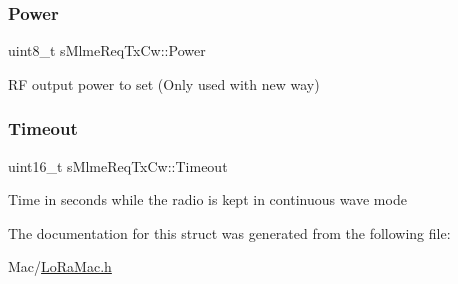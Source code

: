 \subsubsection{\texorpdfstring{Power}{Power}}
{\footnotesize\ttfamily uint8\+\_\+t s\+Mlme\+Req\+Tx\+Cw\+::\+Power}

RF output power to set (Only used with new way) \mbox{\label{structsMlmeReqTxCw_a62e506374c3c4b59c4ef10d01e02768f}} 
\subsubsection{\texorpdfstring{Timeout}{Timeout}}
{\footnotesize\ttfamily uint16\+\_\+t s\+Mlme\+Req\+Tx\+Cw\+::\+Timeout}

Time in seconds while the radio is kept in continuous wave mode 

The documentation for this struct was generated from the following file\+:\begin{DoxyCompactItemize}
\item 
Mac/\hyperlink{LoRaMac_8h}{Lo\+Ra\+Mac.\+h}\end{DoxyCompactItemize}
